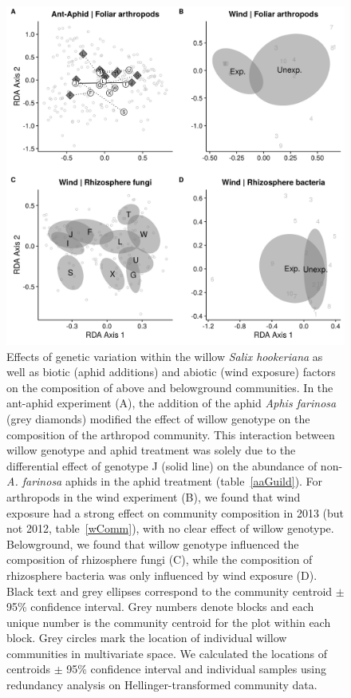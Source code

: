 \documentclass[11pt]{article}
\begin{document}
\begin{figure}%
\centering
\includegraphics[scale = 0.65]{fig_2.png}
\caption{Effects of genetic variation within the willow
\emph{\textit{Salix hookeriana}} as well as biotic (aphid additions) and
abiotic (wind exposure) factors on the composition of above and
belowground communities. In the ant-aphid experiment (A), the addition
of the aphid \emph{Aphis farinosa} (grey diamonds) modified the
effect of willow genotype on the composition of the arthropod community.
This interaction between willow genotype and aphid treatment was solely
due to the differential effect of genotype J (solid line) on the
abundance of non-\emph{A. farinosa} aphids in the aphid treatment (table~\ref{aaGuild}).
For arthropods in the wind experiment (B), we found that wind exposure
had a strong effect on community composition in 2013 (but not 2012,
table~\ref{wComm}), with no clear effect of willow genotype. Belowground, we
found that willow genotype influenced the composition of rhizosphere
fungi (C), while the composition of rhizosphere bacteria was only influenced
by wind exposure (D). Black text and grey ellipses correspond to the
community centroid $\pm$ 95\% confidence interval. Grey numbers denote
blocks and each unique number is the community centroid for the plot
within each block. Grey circles mark the location of individual willow
communities in multivariate space. We calculated the locations of
centroids $\pm$ 95\% confidence interval and individual samples using
redundancy analysis on Hellinger-transformed community data.}
\label{Fig:GxEcomp}
\end{figure}
\end{document}
